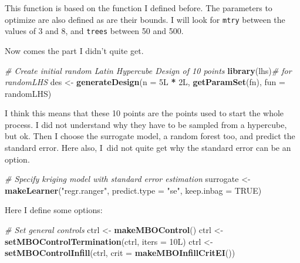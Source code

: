 \documentclass[]{gitbook}
\newenvironment{Shaded}{\begin{snugshade}}{\end{snugshade}}
\newcommand{\CommentTok}[1]{\textcolor[rgb]{0.56,0.35,0.01}{\textit{#1}}}
\newcommand{\DataTypeTok}[1]{\textcolor[rgb]{0.13,0.29,0.53}{#1}}
\newcommand{\KeywordTok}[1]{\textcolor[rgb]{0.13,0.29,0.53}{\textbf{#1}}}
\newcommand{\NormalTok}[1]{#1}
\newcommand{\OperatorTok}[1]{\textcolor[rgb]{0.81,0.36,0.00}{\textbf{#1}}}
\newcommand{\OtherTok}[1]{\textcolor[rgb]{0.56,0.35,0.01}{#1}}
\newcommand{\StringTok}[1]{\textcolor[rgb]{0.31,0.60,0.02}{#1}}
\theoremstyle{definition}
\theoremstyle{definition}
\theoremstyle{definition}
\theoremstyle{remark}
\begin{document}
This function is based on the function I defined before. The parameters
to optimize are also defined as are their bounds. I will look for
\texttt{mtry} between the values of 3 and 8, and \texttt{trees} between
50 and 500.

Now comes the part I didn't quite get.

\begin{Shaded}
\begin{Highlighting}[]
\CommentTok{# Create initial random Latin Hypercube Design of 10 points}
\KeywordTok{library}\NormalTok{(lhs)}\CommentTok{# for randomLHS}
\NormalTok{des <-}\StringTok{ }\KeywordTok{generateDesign}\NormalTok{(}\DataTypeTok{n =}\NormalTok{ 5L }\OperatorTok{*}\StringTok{ }\NormalTok{2L, }\KeywordTok{getParamSet}\NormalTok{(fn), }\DataTypeTok{fun =}\NormalTok{ randomLHS)}
\end{Highlighting}
\end{Shaded}

I think this means that these 10 points are the points used to start the
whole process. I did not understand why they have to be sampled from a
hypercube, but ok. Then I choose the surrogate model, a random forest
too, and predict the standard error. Here also, I~did not quite get why
the standard error can be an option.

\begin{Shaded}
\begin{Highlighting}[]
\CommentTok{# Specify kriging model with standard error estimation}
\NormalTok{surrogate <-}\StringTok{ }\KeywordTok{makeLearner}\NormalTok{(}\StringTok{"regr.ranger"}\NormalTok{, }\DataTypeTok{predict.type =} \StringTok{"se"}\NormalTok{, }\DataTypeTok{keep.inbag =} \OtherTok{TRUE}\NormalTok{)}
\end{Highlighting}
\end{Shaded}

Here I define some options:

\begin{Shaded}
\begin{Highlighting}[]
\CommentTok{# Set general controls}
\NormalTok{ctrl <-}\StringTok{ }\KeywordTok{makeMBOControl}\NormalTok{()}
\NormalTok{ctrl <-}\StringTok{ }\KeywordTok{setMBOControlTermination}\NormalTok{(ctrl, }\DataTypeTok{iters =}\NormalTok{ 10L)}
\NormalTok{ctrl <-}\StringTok{ }\KeywordTok{setMBOControlInfill}\NormalTok{(ctrl, }\DataTypeTok{crit =} \KeywordTok{makeMBOInfillCritEI}\NormalTok{())}
\end{Highlighting}
\end{Shaded}
\end{document}
